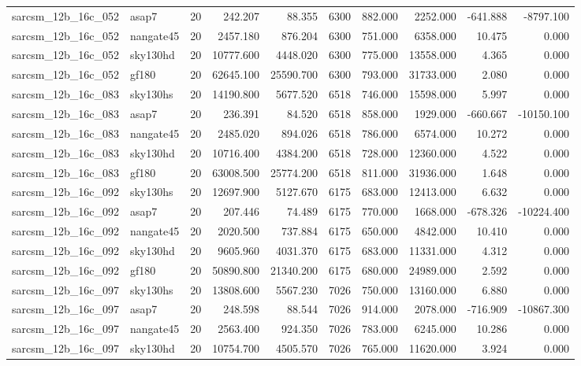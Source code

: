 \documentclass{article}
\begin{document}
\begin{longtable}{llrrrrrrrr}
sarcsm\_12b\_16c\_052 & asap7 & 20 & 242.207 & 88.355 & 6300 & 882.000 & 2252.000 & -641.888 & -8797.100 \\
sarcsm\_12b\_16c\_052 & nangate45 & 20 & 2457.180 & 876.204 & 6300 & 751.000 & 6358.000 & 10.475 & 0.000 \\
sarcsm\_12b\_16c\_052 & sky130hd & 20 & 10777.600 & 4448.020 & 6300 & 775.000 & 13558.000 & 4.365 & 0.000 \\
sarcsm\_12b\_16c\_052 & gf180 & 20 & 62645.100 & 25590.700 & 6300 & 793.000 & 31733.000 & 2.080 & 0.000 \\
sarcsm\_12b\_16c\_083 & sky130hs & 20 & 14190.800 & 5677.520 & 6518 & 746.000 & 15598.000 & 5.997 & 0.000 \\
sarcsm\_12b\_16c\_083 & asap7 & 20 & 236.391 & 84.520 & 6518 & 858.000 & 1929.000 & -660.667 & -10150.100 \\
sarcsm\_12b\_16c\_083 & nangate45 & 20 & 2485.020 & 894.026 & 6518 & 786.000 & 6574.000 & 10.272 & 0.000 \\
sarcsm\_12b\_16c\_083 & sky130hd & 20 & 10716.400 & 4384.200 & 6518 & 728.000 & 12360.000 & 4.522 & 0.000 \\
sarcsm\_12b\_16c\_083 & gf180 & 20 & 63008.500 & 25774.200 & 6518 & 811.000 & 31936.000 & 1.648 & 0.000 \\
sarcsm\_12b\_16c\_092 & sky130hs & 20 & 12697.900 & 5127.670 & 6175 & 683.000 & 12413.000 & 6.632 & 0.000 \\
sarcsm\_12b\_16c\_092 & asap7 & 20 & 207.446 & 74.489 & 6175 & 770.000 & 1668.000 & -678.326 & -10224.400 \\
sarcsm\_12b\_16c\_092 & nangate45 & 20 & 2020.500 & 737.884 & 6175 & 650.000 & 4842.000 & 10.410 & 0.000 \\
sarcsm\_12b\_16c\_092 & sky130hd & 20 & 9605.960 & 4031.370 & 6175 & 683.000 & 11331.000 & 4.312 & 0.000 \\
sarcsm\_12b\_16c\_092 & gf180 & 20 & 50890.800 & 21340.200 & 6175 & 680.000 & 24989.000 & 2.592 & 0.000 \\
sarcsm\_12b\_16c\_097 & sky130hs & 20 & 13808.600 & 5567.230 & 7026 & 750.000 & 13160.000 & 6.880 & 0.000 \\
sarcsm\_12b\_16c\_097 & asap7 & 20 & 248.598 & 88.544 & 7026 & 914.000 & 2078.000 & -716.909 & -10867.300 \\
sarcsm\_12b\_16c\_097 & nangate45 & 20 & 2563.400 & 924.350 & 7026 & 783.000 & 6245.000 & 10.286 & 0.000 \\
sarcsm\_12b\_16c\_097 & sky130hd & 20 & 10754.700 & 4505.570 & 7026 & 765.000 & 11620.000 & 3.924 & 0.000 \\

\end{longtable}
\end{document}
